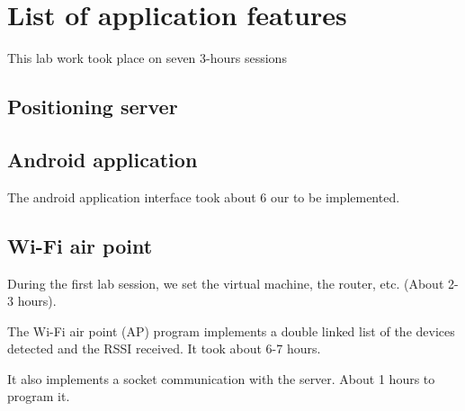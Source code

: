 \section{List of application features}

This lab work took place on seven 3-hours sessions

\subsection{Positioning server}

\subsection{Android application}

The android application interface took about 6 our to be implemented.



\subsection{Wi-Fi air point}

During the first lab session, we set the virtual machine, the router, etc.
(About 2-3 hours).

The Wi-Fi air point (AP) program implements a double linked list of the devices
detected and the RSSI received. It took about 6-7 hours.

It also implements a socket communication with the server. About 1 hours to
program it.





